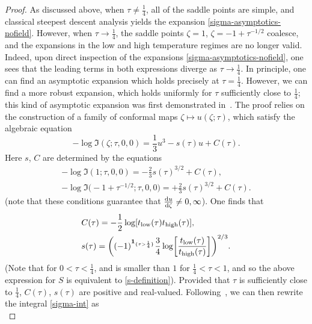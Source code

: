 \documentclass[10pt,a4paper]{amsart}
\numberwithin{equation}{section}
\begin{document}
\begin{proof}
 As discussed above, when $\tau\neq \frac{1}{4}$, all of the saddle points are simple, and classical steepest descent analysis
 yields the expansion \eqref{sigma-asymptotics-nofield}. However, when $\tau\to \frac{1}{4}$, the saddle points $\zeta = 1$,
 $\zeta = -1 + \tau^{-1/2}$ coalesce, and the expansions in the low and high temperature regimes are no longer valid. Indeed,
 upon direct inspection of the expansions \eqref{sigma-asymptotics-nofield}, one sees that the leading terms in
 both expressions diverge as $\tau\to \frac{1}{4}$. In principle, one can find an asymptotic expansion which holds precisely at
 $\tau = \frac{1}{4}$. However, we can find a more robust expansion, which holds uniformly for $\tau$ sufficiently close to
 $\frac{1}{4}$; this kind of asymptotic expansion was first demonstrated in~\cite{CFU}. The proof relies on the construction
 of a family of conformal maps $\zeta \mapsto u(\zeta;\tau)$, which satisfy the algebraic equation
 \begin{equation}\label{conformal-map-eq}
 -\log \mathfrak{I}(\zeta;\tau,0,0) = \frac{1}{3} u^3 -s(\tau) u + C(\tau).
 \end{equation}
 Here $s$, $C$ are determined by the equations
 \begin{gather*}
 -\log \mathfrak{I}(1;\tau,0,0) = -\frac{2}{3}s(\tau)^{3/2} + C(\tau),\\
 -\log \mathfrak{I}\bigl(-1+\tau^{-1/2};\tau,0,0\bigr) = + \frac{2}{3}s(\tau)^{3/2} + C(\tau).
 \end{gather*}
 \big(note that these conditions guarantee that $\frac{{\rm d}u}{{\rm d}\zeta}\neq 0,\infty$\big). One finds that
 \begin{align*}
 &C(\tau) = -\frac{1}{2}\log[t_{{\rm low}}(\tau)t_{{\rm high}}(\tau)],\\
 &s(\tau) = \biggl((-1)^{\mathbf{1}_{\{\tau>\frac{1}{4}\}}}\frac{3}{4}\log\biggl[\frac{t_{{\rm low}}(\tau)}{t_{{\rm high}}(\tau)}\biggr]\biggr)^{2/3}.
 \end{align*}
\big(Note that  for $0 < \tau < \frac{1}{4}$, and is smaller than $1$ for $\frac{1}{4} < \tau < 1$, and
so the above expression for $S$ is equivalent to \eqref{s-definition}\big). Provided that $\tau$ is sufficiently close to $\frac{1}{4}$, $C(\tau)$, $s(\tau)$ are positive and real-valued.
 Following~\cite{CFU}, we can then rewrite the integral \eqref{sigma-int} as
 \begin{equation*} %

\end{equation*}
\end{proof}
\end{document}
